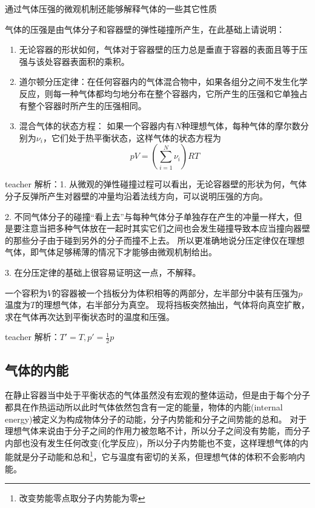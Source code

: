 通过气体压强的微观机制还能够解释气体的一些其它性质
\begin{example}
气体的压强是由气体分子和容器壁的弹性碰撞所产生，在此基础上请说明：
\begin{enumerate}
\item 无论容器的形状如何，气体对于容器壁的压力总是垂直于容器的表面且等于压强与该处容器表面积的乘积。
\item  道尔顿分压定律：在任何容器内的气体混合物中，如果各组分之间不发生化学反应，则每一种气体都均匀地分布在整个容器内，它所产生的压强和它单独占有整个容器时所产生的压强相同。
\item 混合气体的状态方程： 如果一个容器内有$N$种理想气体，每种气体的摩尔数分别为$\nu_i$，它们处于热平衡状态，这样气体的状态方程为
\begin{equation}
pV = \left(\sum_{i=1}^N \nu_i\right)RT
\end{equation}
\end{enumerate}
\begin{taggedblock}{teacher}
\noindent
解析：1. 从微观的弹性碰撞过程可以看出，无论容器壁的形状为何，气体分子反弹所产生对器壁的冲量均沿着法线方向，可以说明压强的方向。

2. 不同气体分子的碰撞“看上去”与每种气体分子单独存在产生的冲量一样大，但是要注意当把多种气体放在一起时其实它们之间也会发生碰撞导致本应当撞向器壁的那些分子由于碰到另外的分子而撞不上去。
所以更准确地说分压定律仅在理想气体，即气体足够稀薄的情况下才能够由微观机制给出。

3. 在分压定律的基础上很容易证明这一点，不解释。
\end{taggedblock}
\end{example}

\begin{example}
一个容积为$V$的容器被一个挡板分为体积相等的两部分，左半部分中装有压强为$p$温度为$T$的理想气体，右半部分为真空。
现将挡板突然抽出，气体将向真空扩散，求在气体再次达到平衡状态时的温度和压强。
\begin{taggedblock}{teacher}
\newline
解析：$T'=T, p'=\frac{1}{2}p$
\end{taggedblock}
\end{example}



\subsection{气体的内能}
在静止容器当中处于平衡状态的气体虽然没有宏观的整体运动，但是由于每个分子都具在作热运动所以此时气体依然包含有一定的能量，物体的{\heiti 内能}(internal energy)被定义为构成物体分子的动能，分子内势能和分子之间势能的总和。
对于理想气体来说由于分子之间的作用力被忽略不计，所以分子之间没有势能，而分子内部也没有发生任何改变(化学反应)，所以分子内势能也不变，这样理想气体的内能就是分子动能和总和\footnote{改变势能零点取分子内势能为零}，它与温度有密切的关系，但理想气体的体积不会影响内能。


